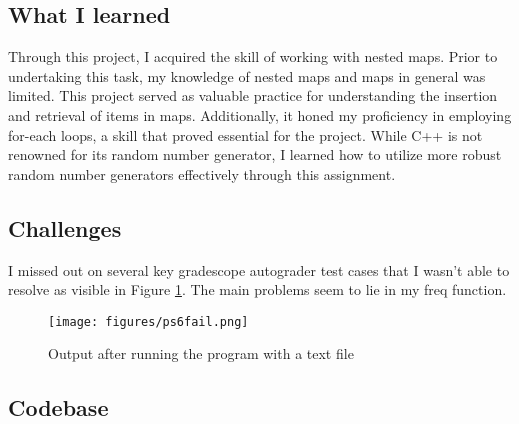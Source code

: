 \subsection{What I learned}\label{sec:ps6:learned}

Through this project, I acquired the skill of working with nested maps. Prior to undertaking this task, my knowledge of nested maps and maps in general was limited. This project served as valuable practice for understanding the insertion and retrieval of items in maps. Additionally, it honed my proficiency in employing for-each loops, a skill that proved essential for the project. While C++ is not renowned for its random number generator, I learned how to utilize more robust random number generators effectively through this assignment. 

\subsection{Challenges}\label{sec:ps6:challenges}
I missed out on several key gradescope autograder test cases that I wasn't able to resolve as visible in Figure \ref{fig:ps6fail}. The main problems seem to lie in my freq function.

\begin{figure}[tbh]
	\centering
	\texttt{[image: figures/ps6fail.png]}
	\caption{Output after running the program with a text file}
	\label{fig:ps6fail}
\end{figure}

\subsection{Codebase}\label{sec:ps6:code}







\newpage
